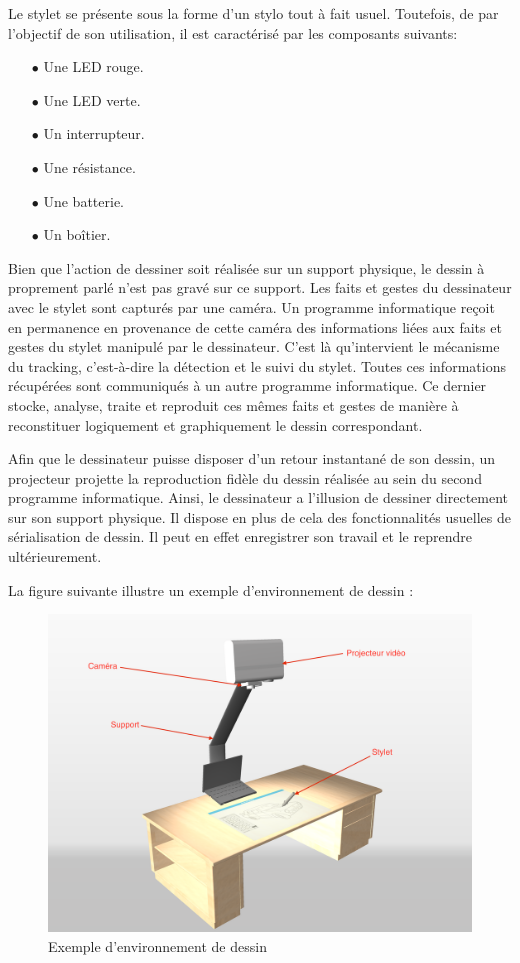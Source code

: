 \documentclass[11pt,a4paper,oldfontcommands]{memoir}
\begin{document}
Le stylet se présente sous la forme d'un stylo tout à fait usuel. Toutefois, de par l'objectif de son utilisation, il est caractérisé par les composants suivants:

\begin{itemize}
\item[$\bullet$] Une LED rouge.
\item[$\bullet$] Une LED verte.
\item[$\bullet$] Un interrupteur.
\item[$\bullet$] Une résistance.
\item[$\bullet$] Une batterie.
\item[$\bullet$] Un boîtier.
\end{itemize}

Bien que l'action de dessiner soit réalisée sur un support physique, le dessin à proprement parlé n'est pas gravé sur ce support. Les faits et gestes du dessinateur avec le stylet sont capturés par une caméra. Un programme informatique reçoit en permanence en provenance de cette caméra des informations liées aux faits et gestes du stylet manipulé par le dessinateur. C'est là qu'intervient le mécanisme du tracking, c'est-à-dire la détection et le suivi du stylet. Toutes ces informations récupérées sont communiqués à un autre programme informatique. Ce dernier stocke, analyse, traite et reproduit ces mêmes faits et gestes de manière à reconstituer logiquement et graphiquement le dessin correspondant.

Afin que le dessinateur puisse disposer d'un retour instantané de son dessin, un projecteur projette la reproduction fidèle du dessin réalisée au sein du second programme informatique. Ainsi, le dessinateur a l'illusion de dessiner directement sur son support physique. Il dispose en plus de cela des fonctionnalités usuelles de sérialisation de dessin. Il peut en effet enregistrer son travail et le reprendre ultérieurement.

La figure suivante illustre un exemple d'environnement de dessin :

\begin{figure}[h]
\centering
\includegraphics[scale=0.055]{images/drawing-environment.png}
\caption{Exemple d'environnement de dessin}
\end{figure}
\end{document}
